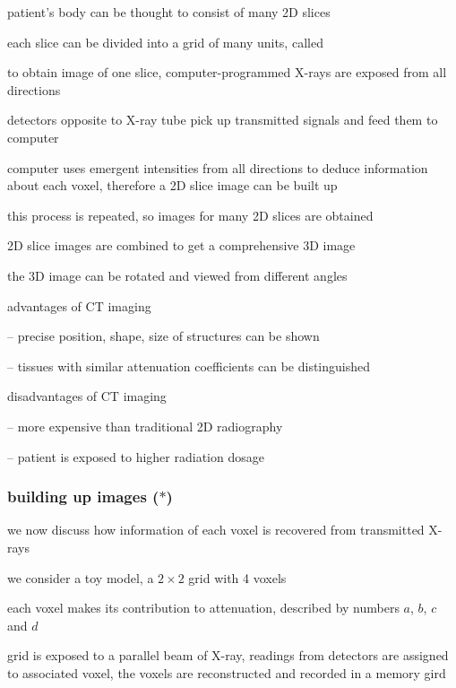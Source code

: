 patient's body can be thought to consist of many 2D slices

each slice can be divided into a grid of many units, called 

to obtain image of one slice, computer-programmed X-rays are exposed from all directions

detectors opposite to X-ray tube pick up transmitted signals and feed them to computer

computer uses emergent intensities from all directions to deduce information about each voxel, therefore a 2D slice image can be built up

this process is repeated, so images for many 2D slices are obtained

2D slice images are combined to get a comprehensive 3D image

the 3D image can be rotated and viewed from different angles

\cmt advantages of CT imaging

\begin{compactitem}
	\item[--] precise position, shape, size of structures can be shown
	
	\item[--] tissues with similar attenuation coefficients can be distinguished

\end{compactitem}

\cmt disadvantages of CT imaging

\begin{compactitem}
	\item[--] more expensive than traditional 2D radiography
	
	\item[--] patient is exposed to higher radiation dosage
\end{compactitem}

\subsubsection*{building up images ($\ast$)}

we now discuss how information of each voxel is recovered from transmitted X-rays

we consider a toy model, a $2\times2$ grid with 4 voxels

each voxel makes its contribution to attenuation, described by numbers $a$, $b$, $c$ and $d$

grid is exposed to a parallel beam of X-ray, readings from detectors are assigned to associated voxel, the voxels are reconstructed and recorded in a memory gird

